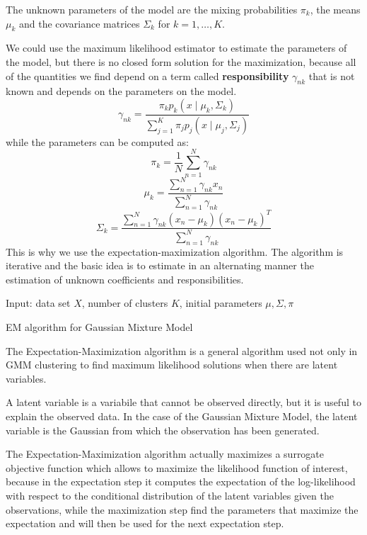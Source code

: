 The unknown parameters of the model are the mixing probabilities $\pi_k$, the means $\mu_k$ and the covariance matrices $\Sigma_k$ for $k=1, \ldots, K$.

We could use the maximum likelihood estimator to estimate the parameters of the model, but there is no closed form solution for the maximization, because all of the quantities we find depend on a term called \textbf{responsibility} $\gamma_{nk}$ that is not known and depends on the parameters on the model.
\[
    \gamma_{nk} = \frac{\pi_k p_k(x \mid \mu_k, \Sigma_k)}{\sum_{j=1}^{K} \pi_j p_j(x \mid \mu_j, \Sigma_j)}
\]
while the parameters can be computed as:
\[
    \pi_k = \frac{1}{N} \sum_{n=1}^{N} \gamma_{nk}
\]
\[
    \mu_k = \frac{\sum_{n=1}^{N} \gamma_{nk} x_n}{\sum_{n=1}^{N} \gamma_{nk}}
\]
\[
    \Sigma_k = \frac{\sum_{n=1}^{N} \gamma_{nk} (x_n - \mu_k)(x_n - \mu_k)^T}{\sum_{n=1}^{N} \gamma_{nk}}
\]
This is why we use the expectation-maximization algorithm. The algorithm is iterative and the basic idea is to estimate in an alternating manner the estimation of unknown coefficients and responsibilities.

\begin{algorithm}
    \SetAlgoLined
    Input: data set $X$, number of clusters $K$, initial parameters $\mu, \Sigma, \pi$ \\
    \caption{EM algorithm for Gaussian Mixture Model}
\end{algorithm}



The Expectation-Maximization algorithm is a general algorithm used not only in GMM clustering to find maximum likelihood solutions when there are latent variables.

A latent variable is a variabile that cannot be observed directly, but it is useful to explain the observed data. In the case of the Gaussian Mixture Model, the latent variable is the Gaussian from which the observation has been generated.

The Expectation-Maximization algorithm actually maximizes a surrogate objective function which allows to maximize the likelihood function of interest, because in the expectation step it computes the expectation of the log-likelihood with respect to the conditional distribution of the latent variables given the observations, while the maximization step find the parameters that maximize the expectation and will then be used for the next expectation step.

